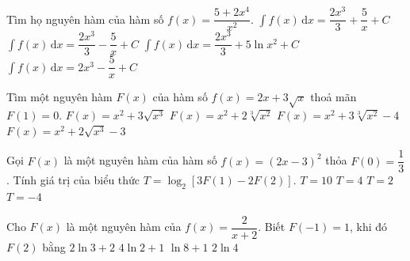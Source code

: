 \begin{ex}
	Tìm họ nguyên hàm của hàm số $f(x)=\dfrac{5+2x^4}{x^2}$.
	\choice
	{$\displaystyle\int f(x)\mathrm{\,d}x=\dfrac{2x^3}{3}+\dfrac{5}{x}+C$}
	{\True $\displaystyle\int f(x)\mathrm{\,d}x=\dfrac{2x^3}{3}-\dfrac{5}{x}+C$}
	{$\displaystyle\int f(x)\mathrm{\,d}x=\dfrac{2x^3}{3}+5\ln x^2+C$}
	{$\displaystyle\int f(x)\mathrm{\,d}x=2x^3-\dfrac{5}{x}+C$}
\end{ex}

\begin{ex}
	Tìm một nguyên hàm $F(x)$ của hàm số $f(x)=2x+3\sqrt{x}$ thoả mãn $F(1)=0$.
	\choice
	{$F(x)=x^2+3\sqrt{x^3}$}
	{$F(x)=x^2+2\sqrt[3]{x^2}$}
	{$F(x)=x^2+3\sqrt[3]{x^2}-4$}
	{\True$F(x)=x^2+2\sqrt{x^3}-3$}
\end{ex}

\begin{ex}
	Gọi $F\left( x \right)$ là một nguyên hàm của hàm số $f\left( x \right)={{\left( 2x-3 \right)}^2}$ thỏa $F\left( 0 \right)=\dfrac{1}{3}$. Tính giá trị của biểu thức $T={{\log }_2}\left[ 3F\left( 1 \right)-2F\left( 2 \right) \right]$.
	\choice
	{$T=10$}
	{$T=4$}
	{\True $T=2$}
	{$T=-4$}
\end{ex}

\begin{ex}%
	Cho $F(x)$ là một nguyên hàm của $f(x)=\dfrac{2}{x+2}$. Biết $F(-1)=1$, khi đó $F(2)$ bằng
	\choice
	{$ 2\ln 3 +2$}
	{\True $ 4\ln 2 +1 $}
	{$ \ln 8 +1 $}
	{$ 2\ln 4 $}
\end{ex}

